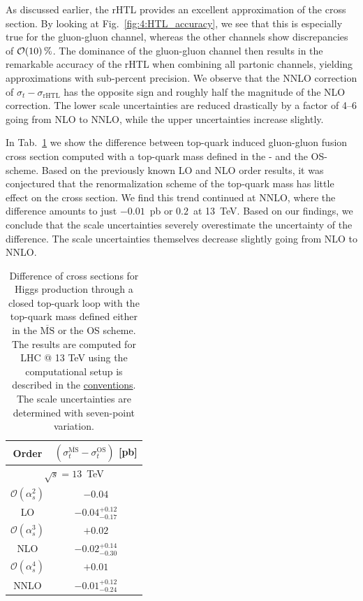 As discussed earlier, the \acs{rHTL} provides an excellent approximation of the cross section. By looking at Fig.~\ref{fig:4:HTL_accuracy}, we see that this is especially true for the gluon-gluon channel, whereas the other channels show discrepancies of $\mathcal{O}\!\left(10\right)\%$. The dominance of the gluon-gluon channel then results in the remarkable accuracy of the \acs{rHTL} when combining all partonic channels, yielding approximations with sub-percent precision. We observe that the \acs{NNLO} correction of $\sigma_t - \sigma_{\text{rHTL}}$ has the opposite sign and roughly half the magnitude of the \acs{NLO} correction. The lower scale uncertainties are reduced drastically by a factor of 4--6 going from \acs{NLO} to \acs{NNLO}, while the upper uncertainties increase slightly.

In Tab.~\ref{tab:6:topSchemeDifference} we show the difference between top-quark induced gluon-gluon fusion cross section computed with a top-quark mass defined in the \MS- and the \acs{OS}-scheme. Based on the previously known \acs{LO} and \acs{NLO} order results, it was conjectured that the renormalization scheme of the top-quark mass has little effect on the cross section. We find this trend continued at \acs{NNLO}, where the difference amounts to just $-0.01$~pb or $0.2$\textperthousand\ at 13~TeV. Based on our findings, we conclude that the scale uncertainties severely overestimate the uncertainty of the difference. The scale uncertainties themselves decrease slightly going from \acs{NLO} to \acs{NNLO}.
\begin{table}[t]
  \centering
  \begin{tabular}{cc}
  \hline
      Order & $(\sigma_t^{\overline{\mathrm{MS}}} - \sigma_t^{\mathrm{OS}})$ [pb] \\
  \hline
  \hline
  \multicolumn{2}{c}{$\sqrt{s}=13$~TeV} \\
  \hline
  $\mathcal{O}(\alpha_s^2)$     & $-0.04$ \\
  LO & $-0.04^{+0.12}_{-0.17}$ \\
  \hline
  $\mathcal{O}(\alpha_s^3)$ & $+0.02$ \\
  NLO & $-0.02^{+0.14}_{-0.30}$ \\
  \hline
  $\mathcal{O}(\alpha_s^4)$ & $+0.01$ \\
  NNLO & $-0.01^{+0.12}_{-0.24}$ \\
  \hline
  \end{tabular}
\caption{Difference of cross sections for Higgs production through a closed top-quark loop with the top-quark mass defined either in the $\overline{\mathrm{MS}}$ or the OS scheme. The results are computed for LHC @ 13 TeV using the computational setup is described in the \hyperref[chap:notation_and_conventions]{conventions}. The scale uncertainties are determined with seven-point variation.}
\label{tab:6:topSchemeDifference}
\end{table}

